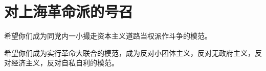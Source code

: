 \section[对上海革命派的号召（一九六七年五月）]{对上海革命派的号召}


希望你们成为同党内一小撮走资本主义道路当权派作斗争的模范。

希望你们成为实行革命大联合的模范，成为反对小团体主义，反对无政府主义，反对经济主义，反对自私自利的模范。


